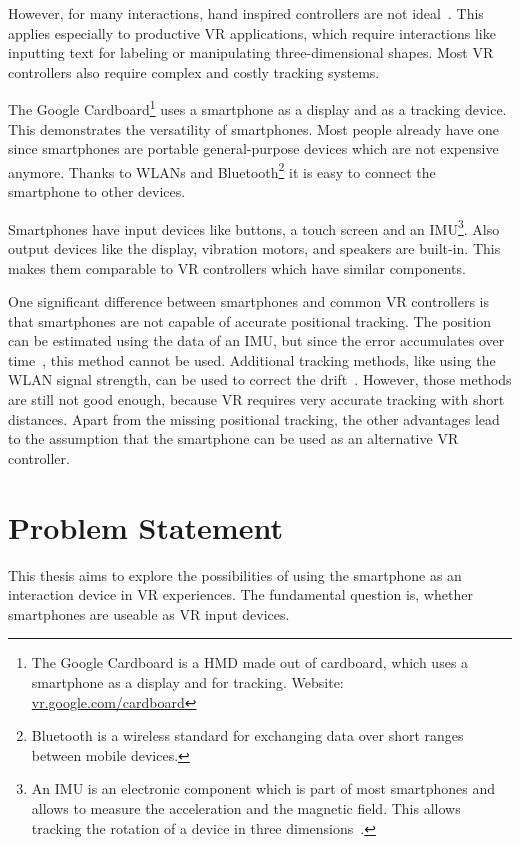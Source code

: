 However, for many interactions, hand inspired controllers are not ideal~\cite{Bowman.2012}. This applies especially to productive \gls{VR} applications, which require interactions like inputting text for labeling or manipulating three-dimensional shapes. Most \gls{VR} controllers also require complex and costly tracking systems.


The Google Cardboard\footnote{The Google Cardboard is a \gls{HMD} made out of cardboard, which uses a smartphone as a display and for tracking. Website: \href{https://vr.google.com/cardboard/}{vr.google.com/cardboard}} uses a smartphone as a display and as a tracking device. This demonstrates the versatility of smartphones. Most people already have one since smartphones are portable general-purpose devices which are not expensive anymore. Thanks to \glspl{WLAN} and Bluetooth\footnote{Bluetooth is a wireless standard for exchanging data over short ranges between mobile devices.} it is easy to connect the smartphone to other devices.

Smartphones have input devices like buttons, a touch screen and an \gls{IMU}\footnote{An IMU is an electronic component which is part of most smartphones and allows to measure the acceleration and the magnetic field. This allows tracking the rotation of a device in three dimensions~\cite[139]{Katzakis.2010}.}. Also output devices like the display, vibration motors, and speakers are built-in. This makes them comparable to \gls{VR} controllers which have similar components.

One significant difference between smartphones and common \gls{VR} controllers is that smartphones are not capable of accurate positional tracking. The position can be estimated using the data of an \gls{IMU}, but since the error accumulates over time~\cite[44]{Steed.2013}, this method cannot be used. Additional tracking methods, like using the \gls{WLAN} signal strength, can be used to correct the drift~\cite{Zhang.2015}. However, those methods are still not good enough, because \gls{VR} requires very accurate tracking with short distances.
Apart from the missing positional tracking, the other advantages lead to the assumption that the smartphone can be used as an alternative \gls{VR} controller.


\section{Problem Statement}\label{section:problem-statement}
This thesis aims to explore the possibilities of using the smartphone as an interaction device in \gls{VR} experiences. The fundamental question is, whether smartphones are useable as \gls{VR} input devices.

